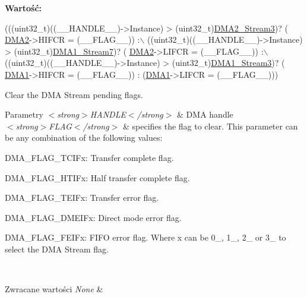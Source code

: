 {\bfseries Wartość\+:}
\begin{DoxyCode}
(((uint32\_t)((\_\_HANDLE\_\_)->Instance) > (uint32\_t)\hyperlink{group___peripheral__declaration_gaa6ead6a5ca6b8df70b5505aaeec6fd2e}{DMA2\_Stream3})? (
      \hyperlink{group___peripheral__declaration_ga506520140eec1708bc7570c49bdf972d}{DMA2}->HIFCR = (\_\_FLAG\_\_)) :\(\backslash\)
 ((uint32\_t)((\_\_HANDLE\_\_)->Instance) > (uint32\_t)\hyperlink{group___peripheral__declaration_ga8ecdeaf43d0f4207dab1fdb4d7bf8d26}{DMA1\_Stream7})? (
      \hyperlink{group___peripheral__declaration_ga506520140eec1708bc7570c49bdf972d}{DMA2}->LIFCR = (\_\_FLAG\_\_)) :\(\backslash\)
 ((uint32\_t)((\_\_HANDLE\_\_)->Instance) > (uint32\_t)\hyperlink{group___peripheral__declaration_ga96ac1af7a92469fe86a9fbdec091f25d}{DMA1\_Stream3})? (
      \hyperlink{group___peripheral__declaration_gacc16d2a5937f7585320a98f7f6b578f9}{DMA1}->HIFCR = (\_\_FLAG\_\_)) : (\hyperlink{group___peripheral__declaration_gacc16d2a5937f7585320a98f7f6b578f9}{DMA1}->LIFCR = (\_\_FLAG\_\_)))
\end{DoxyCode}


Clear the D\+MA Stream pending flags. 


\begin{DoxyParams}{Parametry}
{\em $<$strong$>$\+H\+A\+N\+D\+L\+E$<$/strong$>$} & D\+MA handle \\
\hline
{\em $<$strong$>$\+F\+L\+A\+G$<$/strong$>$} & specifies the flag to clear. This parameter can be any combination of the following values\+: \begin{DoxyItemize}
\item D\+M\+A\+\_\+\+F\+L\+A\+G\+\_\+\+T\+C\+I\+Fx\+: Transfer complete flag. \item D\+M\+A\+\_\+\+F\+L\+A\+G\+\_\+\+H\+T\+I\+Fx\+: Half transfer complete flag. \item D\+M\+A\+\_\+\+F\+L\+A\+G\+\_\+\+T\+E\+I\+Fx\+: Transfer error flag. \item D\+M\+A\+\_\+\+F\+L\+A\+G\+\_\+\+D\+M\+E\+I\+Fx\+: Direct mode error flag. \item D\+M\+A\+\_\+\+F\+L\+A\+G\+\_\+\+F\+E\+I\+Fx\+: F\+I\+FO error flag. Where x can be 0\+\_, 1\+\_, 2\+\_ or 3\+\_ to select the D\+MA Stream flag. \end{DoxyItemize}
\\
\hline
\end{DoxyParams}

\begin{DoxyRetVals}{Zwracane wartości}
{\em None} & \\
\hline
\end{DoxyRetVals}


